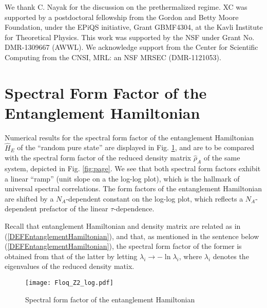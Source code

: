 \documentclass[aps,prb,preprint,onecolumn,amsmath,amssymb,superscriptaddress,eqsecnum,floatfix,scrartcl]{revtex4-1}
\begin{document}
\acknowledgements
We thank  C. Nayak for the discussion on the prethermalized regime. XC was supported by a postdoctoral fellowship from the Gordon and Betty Moore Foundation,
under the EPiQS initiative, Grant GBMF4304, at the Kavli Institute for Theoretical Physics.  
This work was supported by the NSF under Grant No. DMR-1309667 (AWWL).
We acknowledge support from the Center for Scientific Computing from the CNSI, MRL: an NSF MRSEC (DMR-1121053).

\appendix


\section{Spectral Form Factor of the Entanglement Hamiltonian}
\label{SectionAppendixSpectralFormfactorEntanglementHamiltonian}

Numerical results for the spectral form factor of the entanglement Hamiltonian ${\hat H}_E$
of the ``random pure state''
are displayed in Fig. \ref{fig:SpectralFormFactorEntanglementHamiltonian},
and are to be compared with the spectral form factor of the reduced density matrix ${\hat \rho}_A$ of the
same system, depicted in Fig. \ref{fig:page}.
We see that both spectral form factors exhibit a linear ``ramp'' (unit slope on a the log-log plot), which is the hallmark
of   universal spectral correlations.
The form factors
of the entanglement Hamiltonian are shifted by a $N_A$-dependent constant on the log-log plot, which reflects
a $N_A$-dependent prefactor of the linear $\tau$-dependence.

Recall that entanglement Hamiltonian and density matrix are related as in (\ref{DEFEntanglementHamiltonian}),
and that,  as mentioned in the sentence below (\ref{DEFEntanglementHamiltonian}), the spectral form factor of
the former is obtained from that of the latter by letting $\lambda_i \to - \ln \lambda_i$,
where $\lambda_i$ denotes the eigenvalues of the reduced density matix.






\begin{figure}%
\centering
\texttt{[image: Floq\_Z2\_log.pdf]}
\caption{Spectral form factor of the entanglement Hamiltonian}
\label{fig:SpectralFormFactorEntanglementHamiltonian}
\end{figure}
\end{document}
